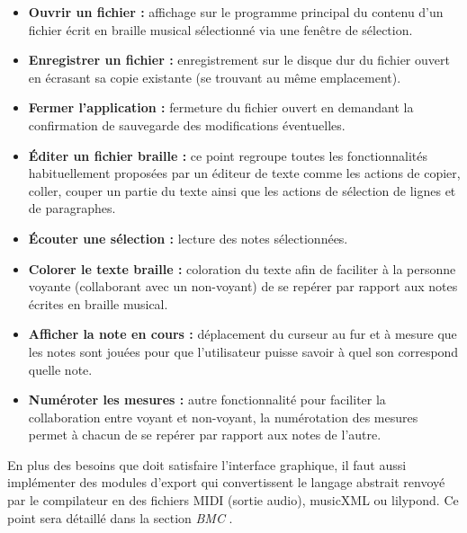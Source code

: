 \begin{itemize}
  \item \textbf{Ouvrir un fichier :} affichage sur le programme principal du contenu d'un fichier écrit en braille musical sélectionné via une fenêtre de sélection.\\
  \item \textbf{Enregistrer un fichier :} enregistrement sur le disque dur du fichier ouvert en écrasant sa copie existante (se trouvant au même emplacement).\\
  \item \textbf{Fermer l'application :} fermeture du fichier ouvert en demandant la confirmation de sauvegarde des modifications éventuelles.\\
  \item \textbf{Éditer un fichier braille :} ce point regroupe toutes les fonctionnalités habituellement proposées par un éditeur de texte comme les actions de copier, coller, couper un partie du texte ainsi que les actions de sélection de lignes et de paragraphes.\\

  \item \textbf{Écouter une sélection :} lecture des notes sélectionnées.\\
  \item \textbf{Colorer le texte braille :} coloration du texte afin de faciliter à la personne voyante (collaborant avec un non-voyant) de se repérer par rapport aux notes écrites en braille musical.\\
  \item \textbf{Afficher la note en cours :} déplacement du curseur au fur et à mesure que les notes sont jouées pour que l'utilisateur puisse savoir à quel son correspond quelle note.\\
  \item \textbf{Numéroter les mesures :} autre fonctionnalité pour faciliter la collaboration entre voyant et non-voyant, la numérotation des mesures permet à chacun de se repérer par rapport aux notes de l'autre.\\
\end{itemize}


En plus des besoins que doit satisfaire l'interface graphique, il faut aussi implémenter des modules d'export qui convertissent le langage abstrait renvoyé par le compilateur en des fichiers MIDI (sortie audio), musicXML ou lilypond. Ce point sera détaillé dans la section \textit{BMC}  .

